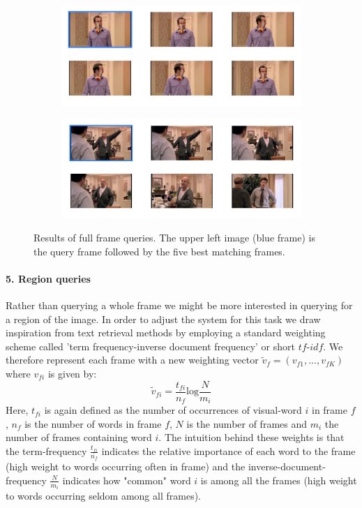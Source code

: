 \documentclass{paper}
\begin{document}
\begin{figure}[h!]
    \centering
    \begin{subfigure}[]{\textwidth}
        \centering
        \includegraphics[width=\textwidth]{query3.png}
    \end{subfigure}
    \begin{subfigure}[]{\textwidth}
        \centering
        \includegraphics[width=\textwidth]{query5.png}
    \end{subfigure}
    \caption{Results of full frame queries. The upper left image (blue frame) is the query frame followed by the five best matching frames. }
\label{fig:fullfFame2}
\end{figure}


\paragraph{5. Region queries}
Rather than querying a whole frame we might be more interested in querying for a region of the image. In order to adjust the system for this task we draw inspiration from text retrieval methods by employing a standard weighting scheme called 'term frequency-inverse document frequency' or short $tf$-$idf$. We therefore represent each frame with a new weighting vector $\tilde{v}_f=(v_{f1},...,v_{fK})$ where $v_{fi}$ is given by:
\begin{equation}
\tilde{v}_{fi}= \frac{t_{fi}}{n_f}\text{log} \frac{N}{m_i}
\end{equation}
Here, $t_{fi}$ is again defined as the number of occurrences of visual-word $i$ in frame $f$, $n_f$ is the number of words in frame $f$, $N$ is the number of frames and $m_i$ the number of frames containing word $i$. The intuition behind these weights is that the term-frequency $\frac{t_{fi}}{n_f}$ indicates the relative importance of each word to the frame (high weight to words occurring often in frame) and the inverse-document-frequency $\frac{N}{m_i}$ indicates how "common" word $i$ is among all the frames (high weight to words occurring seldom among all frames).
\end{document}
